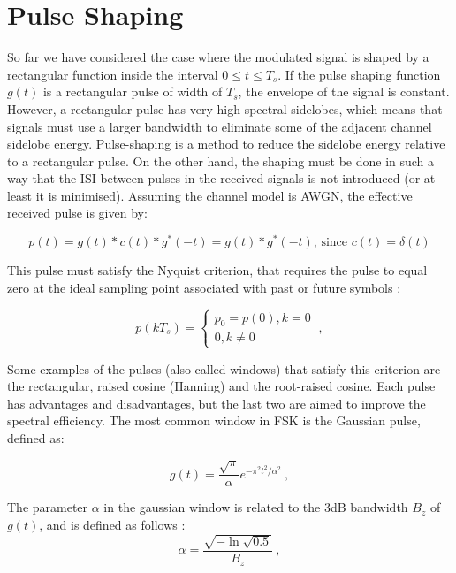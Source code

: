 \documentclass[12pt,a4paper,openright]{report}
\begin{document}
%
\section{Pulse Shaping}
\label{Sec:Pulse shaping}
So far we have considered the case where the modulated signal is shaped by a rectangular function inside the interval $0\leq t \leq T_s$. If the pulse shaping function $g(t)$ is a rectangular pulse of width of $T_s$, the envelope of the signal is constant. However, a rectangular pulse has very high spectral sidelobes, which means that signals must use a larger bandwidth to eliminate some of the adjacent channel sidelobe energy. Pulse-shaping is a method to reduce the sidelobe energy relative to a rectangular pulse. On the other hand, the shaping must be done in such a way that the ISI between pulses in the received signals is not introduced (or at least it is minimised). Assuming the channel model is AWGN, the effective received pulse is given by: 

\begin{equation}
p(t)=g(t) \ast c(t) \ast g^{*}(-t)=g(t) \ast g^{*}(-t) \text{, since }c(t)=\delta(t)
\end{equation}

This pulse must satisfy the Nyquist criterion, that requires the pulse to equal zero at the ideal sampling point associated with past or future symbols \cite{GoertzelPaper}: 

 \begin{equation}
 p(k{T_s}) = \left\{ \begin{array}{l}
 {p_0} = p(0),k = 0\\
 0,k \ne 0
 \end{array} \right.\ ,
 \end{equation}
 
Some examples of the pulses (also called windows) that satisfy this criterion are the rectangular, raised cosine (Hanning) and the root-raised cosine. Each pulse has advantages and disadvantages, but the last two are aimed to improve the spectral efficiency. The most common window in FSK is the Gaussian pulse, defined as: 

 
\begin{equation}\label{Eq:Gaussian Window}
g(t) = \frac{{\sqrt \pi  }}{\alpha }{e^{ - {\pi ^2}{t^2}/{\alpha ^2}}}\ ,
\end{equation}

 The parameter $\alpha$ in the gaussian window is related to the 3dB bandwidth $B_z$ of $g(t)$, and is defined as follows \cite{GoertzelPaper}:
\begin{equation}
\alpha  = \frac{{\sqrt { - \ln \sqrt {0.5} } }}{{{B_z}}}\ ,
\end{equation}
 
\end{document}
